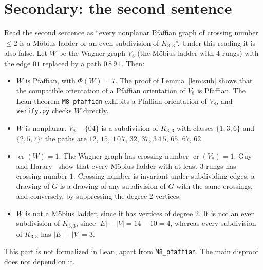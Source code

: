 \documentclass[11pt]{article}
\theoremstyle{definition}
\theoremstyle{remark}
\begin{document}
\section{Secondary: the second sentence}\label{sec:second}
Read the second sentence as ``every nonplanar Pfaffian graph of crossing number
$\le2$ is a M\"obius ladder or an even subdivision of $K_{3,3}$''. Under this
reading it is also false. Let $W$ be the Wagner graph $V_8$ (the M\"obius ladder
with $4$ rungs) with the edge $01$ replaced by a path $0\,8\,9\,1$. Then:
\begin{itemize}
\item $W$ is Pfaffian, with $\Phi(W)=7$. The proof of Lemma~\ref{lem:sub} shows that
the compatible orientation of a Pfaffian orientation of $V_8$ is Pfaffian. The
Lean theorem \texttt{M8\_pfaffian} exhibits a Pfaffian orientation of $V_8$, and
\texttt{verify.py} checks $W$ directly.
\item $W$ is nonplanar. $V_8-\{04\}$ is a subdivision of $K_{3,3}$ with classes
$\{1,3,6\}$ and $\{2,5,7\}$: the paths are $12$, $15$, $1\,0\,7$, $32$, $37$,
$3\,4\,5$, $65$, $67$, $62$.
\item $\operatorname{cr}(W)=1$. The Wagner graph has crossing number
$\operatorname{cr}(V_8)=1$: Guy and Harary~\cite{gh} show that every M\"obius ladder with at
least $3$ rungs has crossing number $1$. Crossing number is invariant under subdividing edges: a drawing
of $G$ is a drawing of any subdivision of $G$ with the same crossings, and
conversely, by suppressing the degree-$2$ vertices.
\item $W$ is not a M\"obius ladder, since it has vertices of degree $2$. It is not an
even subdivision of $K_{3,3}$, since $|E|-|V|=14-10=4$, whereas every subdivision of
$K_{3,3}$ has $|E|-|V|=3$.
\end{itemize}
This part is not formalized in Lean, apart from \texttt{M8\_pfaffian}. The main
disproof does not depend on it.
\end{document}

